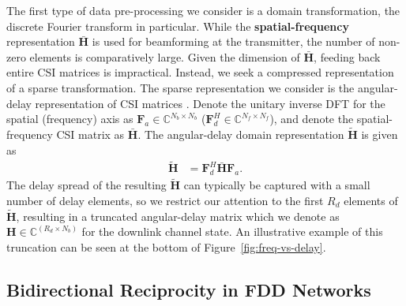 The first type of data pre-processing we consider is a domain transformation, the discrete Fourier transform in particular. While the \textbf{spatial-frequency} representation $\bar{\mathbf H}$ is used for beamforming at the transmitter, the number of non-zero elements is comparatively large. Given the dimension of $\bar{\mathbf H}$, feeding back entire CSI matrices is impractical. Instead, we seek a compressed representation of a sparse transformation. The sparse representation we consider is the angular-delay representation of CSI matrices \cite{ref:sayeed2002deconstructing}. Denote the unitary inverse DFT for the spatial (frequency) axis as $\mathbf F_a \in \mathbb C^{N_b \times N_b}$ ($\mathbf F_d^H \in \mathbb C^{N_f \times N_f}$), and denote the spatial-frequency CSI matrix as $\bar{\mathbf H}$. The angular-delay domain representation $\tilde{\mathbf H}$ is given as %
\begin{align*}
	\tilde{\mathbf H} &= \mathbf F_d^H \bar{\mathbf H} \mathbf F_a.
\end{align*}
The delay spread of the resulting $\tilde{\mathbf H}$ can typically be captured with a small number of delay elements, so we restrict our attention to the first $R_d$ elements of $\tilde{\mathbf H}$, resulting in a truncated angular-delay matrix which we denote as $\mathbf H \in \mathbb C^{(R_d\times N_b)}$ for the downlink channel state. An illustrative example of this truncation can be seen at the bottom of Figure~\ref{fig:freq-vs-delay}. %


\subsection{Bidirectional Reciprocity in FDD Networks}

